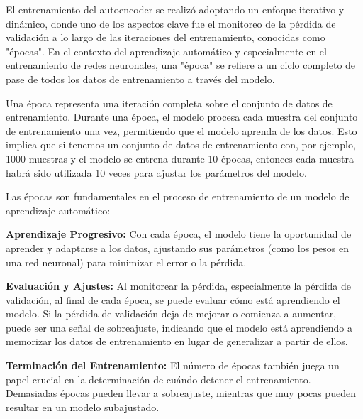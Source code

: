 El entrenamiento del autoencoder se realizó adoptando un enfoque iterativo y dinámico, donde uno de los aspectos clave fue el monitoreo de la pérdida de validación a lo largo de las iteraciones del entrenamiento, conocidas como "épocas". En el contexto del aprendizaje automático y especialmente en el entrenamiento de redes neuronales, una "época" se refiere a un ciclo completo de pase de todos los datos de entrenamiento a través del modelo.

Una época representa una iteración completa sobre el conjunto de datos de entrenamiento. Durante una época, el modelo procesa cada muestra del conjunto de entrenamiento una vez, permitiendo que el modelo aprenda de los datos. Esto implica que si tenemos un conjunto de datos de entrenamiento con, por ejemplo, 1000 muestras y el modelo se entrena durante 10 épocas, entonces cada muestra habrá sido utilizada 10 veces para ajustar los parámetros del modelo.

Las épocas son fundamentales en el proceso de entrenamiento de un modelo de aprendizaje automático:

\textbf{Aprendizaje Progresivo:} Con cada época, el modelo tiene la oportunidad de aprender y adaptarse a los datos, ajustando sus parámetros (como los pesos en una red neuronal) para minimizar el error o la pérdida.

\textbf{Evaluación y Ajustes:} Al monitorear la pérdida, especialmente la pérdida de validación, al final de cada época, se puede evaluar cómo está aprendiendo el modelo. Si la pérdida de validación deja de mejorar o comienza a aumentar, puede ser una señal de sobreajuste, indicando que el modelo está aprendiendo a memorizar los datos de entrenamiento en lugar de generalizar a partir de ellos.

\textbf{Terminación del Entrenamiento:} El número de épocas también juega un papel crucial en la determinación de cuándo detener el entrenamiento. Demasiadas épocas pueden llevar a sobreajuste, mientras que muy pocas pueden resultar en un modelo subajustado.

